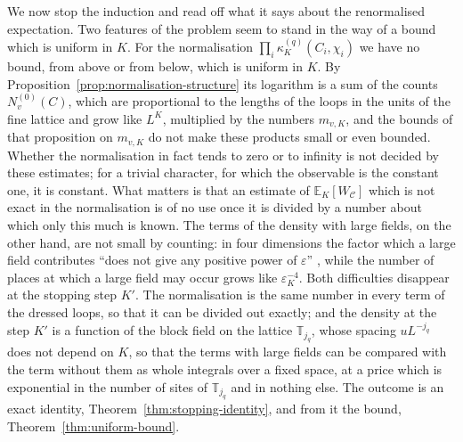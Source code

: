 \documentclass[11pt]{preprint}
\numberwithin{equation}{section}
\theoremstyle{definition}
\theoremstyle{remark}
\theoremstyle{plain}
\begin{document}
We now stop the induction and read off what it says about the renormalised expectation. Two features of the problem seem to stand in the way of a bound which is uniform in $K$. For the normalisation $\prod_i\kappa^{(q)}_K(C_i, \chi_i)$ we have no bound, from above or from below, which is uniform in $K$. By Proposition~\ref{prop:normalisation-structure} its logarithm is a sum of the counts $N^{(0)}_v(C)$, which are proportional to the lengths of the loops in the units of the fine lattice and grow like $L^K$, multiplied by the numbers $m_{v,K}$, and the bounds of that proposition on $m_{v,K}$ do not make these products small or even bounded. Whether the normalisation in fact tends to zero or to infinity is not decided by these estimates; for a trivial character, for which the observable is the constant one, it is constant. What matters is that an estimate of $\mathbb E_K[W_{\mathcal C}]$ which is not exact in the normalisation is of no use once it is divided by a number about which only this much is known. The terms of the density with large fields, on the other hand, are not small by counting: in four dimensions the factor which a large field contributes ``does not give any positive power of $\varepsilon$'' \cite[p.~244]{BalabanCRE}, while the number of places at which a large field may occur grows like $\varepsilon_K^{-4}$. Both difficulties disappear at the stopping step $K'$. The normalisation is the same number in every term of the dressed loops, so that it can be divided out exactly; and the density at the step $K'$ is a function of the block field on the lattice $\mathbb T_{j_q}$, whose spacing $uL^{-j_q}$ does not depend on $K$, so that the terms with large fields can be compared with the term without them as whole integrals over a fixed space, at a price which is exponential in the number of sites of $\mathbb T_{j_q}$ and in nothing else. The outcome is an exact identity, Theorem~\ref{thm:stopping-identity}, and from it the bound, Theorem~\ref{thm:uniform-bound}.
\end{document}
